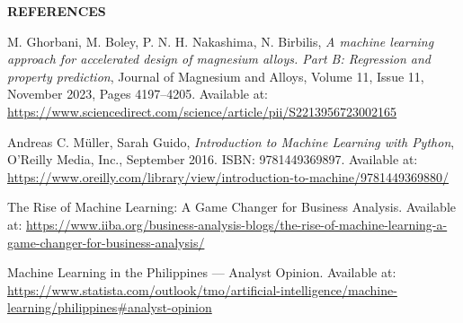 \documentclass[12pt]{article}
\begin{document}
\newpage
\begin{center}
\textbf{REFERENCES}
\end{center}

\begin{thebibliography}{9}

M. Ghorbani, M. Boley, P. N. H. Nakashima, N. Birbilis, 
\textit{A machine learning approach for accelerated design of magnesium alloys. Part B: Regression and property prediction}, 
Journal of Magnesium and Alloys, Volume 11, Issue 11, November 2023, Pages 4197–4205. 
Available at: \url{https://www.sciencedirect.com/science/article/pii/S2213956723002165}

Andreas C. Müller, Sarah Guido,
\textit{Introduction to Machine Learning with Python}, 
O’Reilly Media, Inc., September 2016. ISBN: 9781449369897. 
Available at: \url{https://www.oreilly.com/library/view/introduction-to-machine/9781449369880/}

The Rise of Machine Learning: A Game Changer for Business Analysis. 
Available at: \url{https://www.iiba.org/business-analysis-blogs/the-rise-of-machine-learning-a-game-changer-for-business-analysis/}

Machine Learning in the Philippines — Analyst Opinion. 
Available at: \url{https://www.statista.com/outlook/tmo/artificial-intelligence/machine-learning/philippines#analyst-opinion}

\end{thebibliography}
\end{document}
